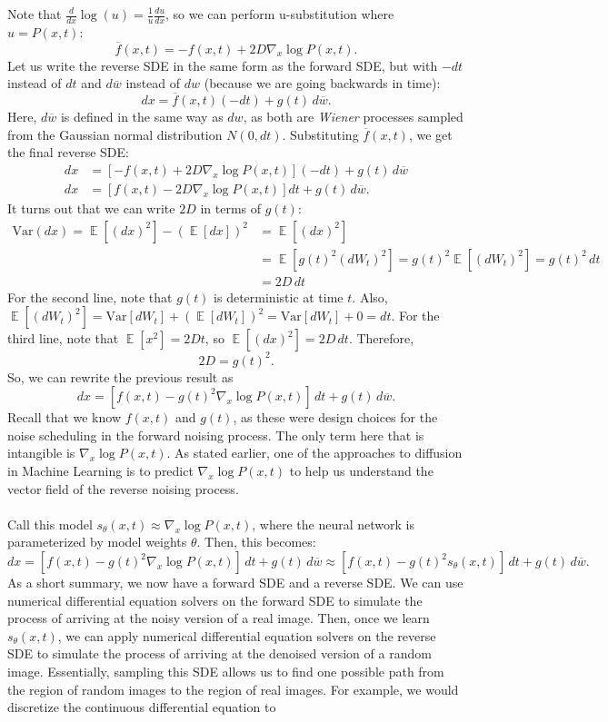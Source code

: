 \documentclass{article}
\DeclareMathOperator{\EX}{\mathbb{E}}
\newcommand{\Var}{\mathrm{Var}}
\begin{document}
Note that $\frac{d}{dx}\log(u)=\frac{1}{u}\frac{du}{dx}$, so we can perform u-substitution where $u=P(x,t)$:
\[\overline{f}(x,t)=-f(x,t)+2D\nabla_x\log P(x,t).\]
Let us write the reverse SDE in the same form as the forward SDE, but with $-dt$ instead of $dt$ and $d\overline{w}$ instead of $dw$ (because we are going backwards in time):
\[dx=\overline{f}(x,t)(-dt) + g(t) \,d\overline{w}.\]
Here, $d\overline{w}$ is defined in the same way as $dw$, as both are \textit{Wiener} processes sampled from the Gaussian normal distribution $N(0,dt)$. Substituting $\overline{f}(x,t)$, we get the final reverse SDE:
\begin{align*}
    dx&=[-f(x,t)+2D\nabla_x\log P(x,t)](-dt) + g(t) \,d\overline{w}\\
    dx&=[f(x,t)-2D\nabla_x\log P(x,t)]dt + g(t) \,d\overline{w}.
\end{align*}
It turns out that we can write $2D$ in terms of $g(t)$:
\begin{align*}
    \Var(dx) = \EX[(dx)^2] - (\EX[dx])^2 &= \EX[(dx)^2]\\ 
    &= \EX[g(t)^2(dW_t)^2] = g(t)^2 \EX[(dW_t)^2] = g(t)^2 \,dt\\
    &= 2D \, dt
\end{align*}
For the second line, note that $g(t)$ is deterministic at time $t$. Also, $\EX[(dW_t)^2] = \Var[dW_t] + (\EX[dW_t])^2 = \Var[dW_t] + 0 = dt$. For the third line, note that $\EX[x^2]=2Dt$, so $\EX[(dx)^2] = 2D \, dt$. Therefore, 
\[2D = g(t)^2.\]
So, we can rewrite the previous result as 
\[dx=[f(x,t)-g(t)^2\nabla_x\log P(x,t)]\,dt + g(t) \,d\overline{w}.\]
Recall that we know $f(x,t)$ and $g(t)$, as these were design choices for the noise scheduling in the forward noising process. The only term here that is intangible is $\nabla_x\log P(x,t)$. As stated earlier, one of the approaches to diffusion in Machine Learning is to predict $\nabla_x\log P(x,t)$ to help us understand the vector field of the reverse noising process. 
\\
\\
Call this model $s_\theta (x,t)\approx \nabla_x\log P(x,t)$, where the neural network is parameterized by model weights $\theta$. Then, this becomes:
\[dx=[f(x,t)-g(t)^2\nabla_x\log P(x,t)]\,dt + g(t) \,d\overline{w} \approx [f(x,t)-g(t)^2s_\theta (x,t)]\,dt + g(t) \,d\overline{w}.\]
As a short summary, we now have a forward SDE and a reverse SDE. We can use numerical differential equation solvers on the forward SDE to simulate the process of arriving at the noisy version of a real image. Then, once we learn $s_\theta (x,t)$, we can apply numerical differential equation solvers on the reverse SDE to simulate the process of arriving at the denoised version of a random image. Essentially, sampling this SDE allows us to find one possible path from the region of random images to the region of real images. For example, we would discretize the continuous differential equation to 
\end{document}

